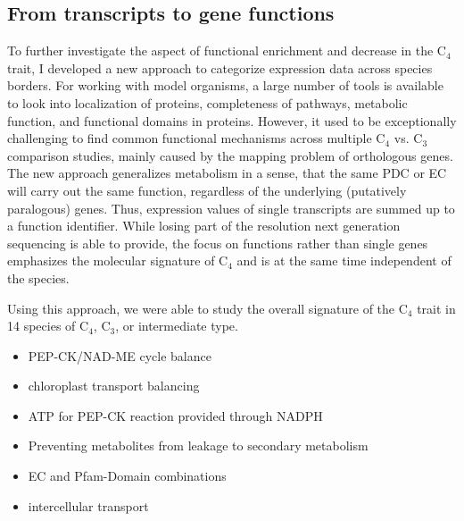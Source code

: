  	\subsection{From transcripts to gene functions}
 	To further investigate the aspect of functional enrichment and decrease in the C$_4$ trait, I developed a new approach to categorize expression data across species borders.
 	For working with model organisms, a large number of tools is available to look into localization of proteins, completeness of pathways, metabolic function, and functional domains in proteins.
 	However, it used to be exceptionally challenging to find common functional mechanisms across multiple C$_4$ vs. C$_3$ comparison studies, mainly caused by the mapping problem of orthologous genes.
 	The new approach generalizes metabolism in a sense, that the same \ac{PDC} or \ac{EC} will carry out the same function, regardless of the underlying (putatively paralogous) genes.
 	Thus, expression values of single transcripts are summed up to a function identifier.
 	While losing part of the resolution next generation sequencing is able to provide, the focus on functions rather than single genes emphasizes the molecular signature of C$_4$ and is at the same time independent of the species.
 	
 	Using this approach, we were able to study the overall signature of the C$_4$ trait in 14 species of C$_4$, C$_3$, or intermediate type.
	\begin{itemize}
		\item PEP-CK/NAD-ME cycle balance
		\item chloroplast transport balancing
		\item ATP for PEP-CK reaction provided through NADPH
		\item Preventing metabolites from leakage to secondary metabolism
		\item EC and Pfam-Domain combinations
		\item intercellular transport
	\end{itemize}
		